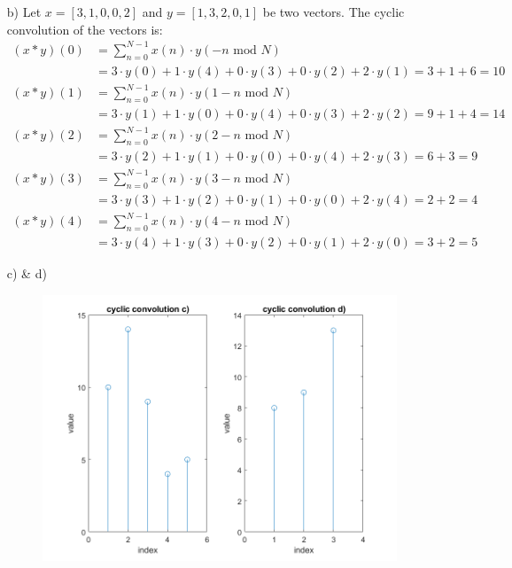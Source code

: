 \documentclass[12pt]{article}
\begin{document}
\begin{itemize}
    \item[b)]
    Let $x = [3,1,0,0,2]$ and $y=[1,3,2,0,1]$ be two vectors. The cyclic convolution of the vectors is:
    \begin{align*}
        (x*y)(0) &= \sum_{n=0}^{N-1}x(n) \cdot y(-n \text{ mod } N)\\
        &= 3 \cdot y(0) + 1 \cdot y(4) + 0 \cdot y(3) + 0 \cdot y(2) + 2 \cdot y(1) = 3 + 1 + 6 = 10\\
        (x*y)(1) &= \sum_{n=0}^{N-1}x(n) \cdot y(1-n \text{ mod } N)\\
        &= 3 \cdot y(1) + 1 \cdot y(0) + 0 \cdot y(4) + 0 \cdot y(3) + 2 \cdot y(2) = 9 + 1 + 4 = 14\\
        (x*y)(2) &= \sum_{n=0}^{N-1}x(n) \cdot y(2-n \text{ mod } N)\\
        &= 3 \cdot y(2) + 1 \cdot y(1) + 0 \cdot y(0) + 0 \cdot y(4) + 2 \cdot y(3) = 6 + 3 = 9\\
        (x*y)(3) &= \sum_{n=0}^{N-1}x(n) \cdot y(3-n \text{ mod } N)\\
        &= 3 \cdot y(3) + 1 \cdot y(2) + 0 \cdot y(1) + 0 \cdot y(0) + 2 \cdot y(4) = 2 + 2 = 4\\
        (x*y)(4) &= \sum_{n=0}^{N-1}x(n) \cdot y(4-n \text{ mod } N)\\
        &= 3 \cdot y(4) + 1 \cdot y(3) + 0 \cdot y(2) + 0 \cdot y(1) + 2 \cdot y(0) = 3 + 2 = 5
    \end{align*}
    \item[c) \& d)]
    \begin{figure}[h]
        \centering
        \includegraphics[width=1.1\textwidth]{Sheet05Exercise1.png}
    \end{figure}
\end{itemize}
\newpage
\end{document}
